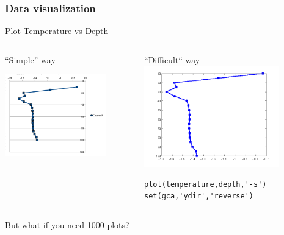 \documentclass{beamer}
\begin{document}
\begin{frame}[fragile]
\frametitle{Data visualization} 
\begin{center}
Plot Temperature vs Depth\\ \end{center}

\begin{columns}[t]
\begin{column}{.5\textwidth}
``Simple'' way


\includegraphics[width=0.8\textwidth,angle=00]{graphOO.png}

\end{column}
\begin{column}{.5\textwidth}
``Difficult`` way
\includegraphics[width=0.8\textwidth,angle=00]{mat_graph.png}
\begin{lstlisting}
plot(temperature,depth,'-s')
set(gca,'ydir','reverse')
\end{lstlisting}
\end{column}
\end{columns}

\pause

\begin{center}
But what if you need 1000 plots?\end{center}
\end{frame}
\end{document}
